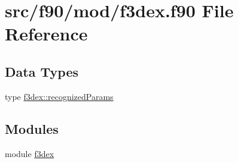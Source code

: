 \hypertarget{f3dex_8f90}{
\section{src/f90/mod/f3dex.f90 File Reference}
\label{f3dex_8f90}
}
\subsection*{Data Types}
\begin{DoxyCompactItemize}
\item 
type \hyperlink{typef3dex_1_1recognized_params}{f3dex::recognizedParams}
\end{DoxyCompactItemize}
\subsection*{Modules}
\begin{DoxyCompactItemize}
\item 
module \hyperlink{namespacef3dex}{f3dex}
\end{DoxyCompactItemize}
